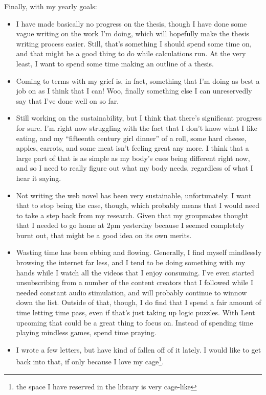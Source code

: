\documentclass[12pt]{article}[titlepage]
\newcommand{\say}[1]{``#1''}
\renewcommand{\,}{\textsuperscript{,}}
\begin{document}
Finally, with my yearly goals:  
\begin{itemize}  
\item I have made basically no progress on the thesis, though I have done some vague writing on the work I'm doing, which will hopefully make the thesis writing process easier.  
Still, that's something I should spend some time on, and that might be a good thing to do while calculations run. At the very least, I want to spend some time making an outline of a thesis.  
\item Coming to terms with my grief is, in fact, something that I'm doing as best a job on as I think that I can! Woo, finally something else I can unreservedly say that I've done well on so far.  
\item Still working on the sustainability, but I think that there's significant progress for sure. I'm right now struggling with the fact that I don't know what I like eating, and my \say{fifteenth century girl dinner} of a roll, some hard cheese, apples, carrots, and some meat isn't feeling great any more. I think that a large part of that is as simple as my body's cues being different right now, and so I need to really figure out what my body needs, regardless of what I hear it saying.  
\item Not writing the web novel has been very sustainable, unfortunately. I want that to stop being the case, though, which probably means that I would need to take a step back from my research. Given that my groupmates thought that I needed to go home at 2pm yesterday because I seemed completely burnt out, that might be a good idea on its own merits.  
\item Wasting time has been ebbing and flowing. Generally, I find myself mindlessly browsing the internet far less, and I tend to be doing something with my hands while I watch all the videos that I enjoy consuming.  
I've even started unsubscribing from a number of the content creators that I followed while I needed constant audio stimulation, and will probably continue to winnow down the list.  
Outside of that, though, I do find that I spend a fair amount of time letting time pass, even if that's just taking up logic puzzles. With Lent upcoming that could be a great thing to focus on. Instead of spending time playing mindless games, spend time praying.  
\item I wrote a few letters, but have kind of fallen off of it lately. I would like to get back into that, if only because I love my cage\footnote{the space I have reserved in the library is very cage-like}.  

\end{itemize}
\end{document}
